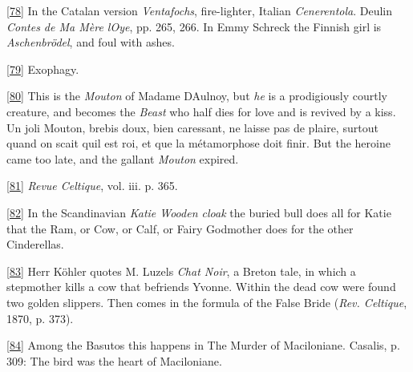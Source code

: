 \documentclass[14pt,a4paper]{memoir}
\begin{document}
\protect\hypertarget{4533318093929944247_33931-h-1.htm.xhtmlux5cux23Footnote_78}{}{}\protect\hyperlink{4533318093929944247_33931-h-1.htm.xhtmlux5cux23FNanchor_78}{{{[}78{]}}}
In the Catalan version \emph{Ventafochs}, fire-lighter, Italian
\emph{Cenerentola}. Deulin \emph{Contes de Ma Mère
l\textquotesingle Oye}, pp. 265, 266. In Emmy Schreck the Finnish girl
is \emph{Aschenbrödel}, and foul with ashes.

\protect\hypertarget{4533318093929944247_33931-h-1.htm.xhtmlux5cux23Footnote_79}{}{}\protect\hyperlink{4533318093929944247_33931-h-1.htm.xhtmlux5cux23FNanchor_79}{{{[}79{]}}}
Exophagy.

\protect\hypertarget{4533318093929944247_33931-h-1.htm.xhtmlux5cux23Footnote_80}{}{}\protect\hyperlink{4533318093929944247_33931-h-1.htm.xhtmlux5cux23FNanchor_80}{{{[}80{]}}}
This is the \emph{Mouton} of Madame D\textquotesingle Aulnoy, but
\emph{he} is a prodigiously courtly creature, and becomes the
\emph{Beast} who half dies for love and is revived by a kiss.
\textquotesingle Un joli Mouton, brebis doux, bien caressant, ne laisse
pas de plaire, surtout quand on scait qu\textquotesingle il est roi, et
que la métamorphose doit finir.\textquotesingle{} But the heroine came
too late, and the gallant \emph{Mouton} expired.

\protect\hypertarget{4533318093929944247_33931-h-1.htm.xhtmlux5cux23Footnote_81}{}{}\protect\hyperlink{4533318093929944247_33931-h-1.htm.xhtmlux5cux23FNanchor_81}{{{[}81{]}}}
\emph{Revue Celtique}, vol. iii. p. 365.

\protect\hypertarget{4533318093929944247_33931-h-1.htm.xhtmlux5cux23Footnote_82}{}{}\protect\hyperlink{4533318093929944247_33931-h-1.htm.xhtmlux5cux23FNanchor_82}{{{[}82{]}}}
In the Scandinavian \emph{Katie Wooden cloak} the buried bull does all
for Katie that the Ram, or Cow, or Calf, or Fairy Godmother does for the
other Cinderellas.

\protect\hypertarget{4533318093929944247_33931-h-1.htm.xhtmlux5cux23Footnote_83}{}{}\protect\hyperlink{4533318093929944247_33931-h-1.htm.xhtmlux5cux23FNanchor_83}{{{[}83{]}}}
Herr Köhler quotes M. Luzel\textquotesingle s \emph{Chat Noir}, a Breton
tale, in which a stepmother kills a cow that befriends Yvonne. Within
the dead cow were found two golden slippers. Then comes in the formula
of the False Bride (\emph{Rev. Celtique}, 1870, p. 373).

\protect\hypertarget{4533318093929944247_33931-h-1.htm.xhtmlux5cux23Footnote_84}{}{}\protect\hyperlink{4533318093929944247_33931-h-1.htm.xhtmlux5cux23FNanchor_84}{{{[}84{]}}}
Among the Basutos this happens in \textquotesingle The Murder of
Maciloniane.\textquotesingle{} Casalis, p. 309: \textquotesingle The
bird was the heart of Maciloniane.\textquotesingle{}
\end{document}
